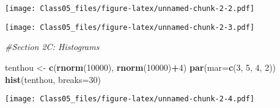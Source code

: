 \documentclass[]{article}
\newenvironment{Shaded}{\begin{snugshade}}{\end{snugshade}}
\newcommand{\KeywordTok}[1]{\textcolor[rgb]{0.13,0.29,0.53}{\textbf{#1}}}
\newcommand{\DataTypeTok}[1]{\textcolor[rgb]{0.13,0.29,0.53}{#1}}
\newcommand{\DecValTok}[1]{\textcolor[rgb]{0.00,0.00,0.81}{#1}}
\newcommand{\CharTok}[1]{\textcolor[rgb]{0.31,0.60,0.02}{#1}}
\newcommand{\StringTok}[1]{\textcolor[rgb]{0.31,0.60,0.02}{#1}}
\newcommand{\CommentTok}[1]{\textcolor[rgb]{0.56,0.35,0.01}{\textit{#1}}}
\newcommand{\OperatorTok}[1]{\textcolor[rgb]{0.81,0.36,0.00}{\textbf{#1}}}
\newcommand{\NormalTok}[1]{#1}
\begin{document}
\texttt{[image: Class05\_files/figure-latex/unnamed-chunk-2-2.pdf]}

\begin{Shaded}
\end{Shaded}

\texttt{[image: Class05\_files/figure-latex/unnamed-chunk-2-3.pdf]}

\begin{Shaded}
\begin{Highlighting}[]
\CommentTok{#Section 2C: Histograms}

\NormalTok{tenthou <-}\StringTok{ }\KeywordTok{c}\NormalTok{(}\KeywordTok{rnorm}\NormalTok{(}\DecValTok{10000}\NormalTok{), }\KeywordTok{rnorm}\NormalTok{(}\DecValTok{10000}\NormalTok{)}\OperatorTok{+}\DecValTok{4}\NormalTok{)}
\KeywordTok{par}\NormalTok{(}\DataTypeTok{mar=}\KeywordTok{c}\NormalTok{(}\DecValTok{3}\NormalTok{, }\DecValTok{5}\NormalTok{, }\DecValTok{4}\NormalTok{, }\DecValTok{2}\NormalTok{))}
\KeywordTok{hist}\NormalTok{(tenthou, }\DataTypeTok{breaks=}\DecValTok{30}\NormalTok{)}
\end{Highlighting}
\end{Shaded}

\texttt{[image: Class05\_files/figure-latex/unnamed-chunk-2-4.pdf]}
\end{document}
